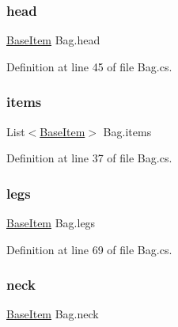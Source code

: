 \mbox{\label{class_bag_aad83c56a14d611f6e1d2fac81903d66c}} 
\subsubsection{\texorpdfstring{head}{head}}
{\footnotesize\ttfamily \mbox{\hyperlink{class_base_item}{Base\+Item}} Bag.\+head\hspace{0.3cm}{\ttfamily [get]}}



Definition at line 45 of file Bag.\+cs.

\mbox{\label{class_bag_a06d313b5ecfa35740d11e1613d1a7695}} 
\subsubsection{\texorpdfstring{items}{items}}
{\footnotesize\ttfamily List$<$\mbox{\hyperlink{class_base_item}{Base\+Item}}$>$ Bag.\+items\hspace{0.3cm}{\ttfamily [get]}}



Definition at line 37 of file Bag.\+cs.

\mbox{\label{class_bag_a06fc81d3974eb764db9be3fda8e63284}} 
\subsubsection{\texorpdfstring{legs}{legs}}
{\footnotesize\ttfamily \mbox{\hyperlink{class_base_item}{Base\+Item}} Bag.\+legs\hspace{0.3cm}{\ttfamily [get]}}



Definition at line 69 of file Bag.\+cs.

\mbox{\label{class_bag_a6796ecd4f3c30c4514d45cce11b1907c}} 
\subsubsection{\texorpdfstring{neck}{neck}}
{\footnotesize\ttfamily \mbox{\hyperlink{class_base_item}{Base\+Item}} Bag.\+neck\hspace{0.3cm}{\ttfamily [get]}}




